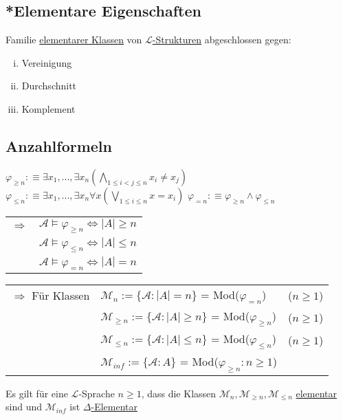 \documentclass[12pt,a4paper]{article} %
\begin{document}
	\subsection{*Elementare Eigenschaften}
	Familie \hyperref[Elementar]{elementarer Klassen} von \hyperref[Struktur]{$\mathcal{L}$-Strukturen} abgeschlossen gegen:
	\begin{enumerate}[(i)]
		\item Vereinigung
		\item Durchschnitt
		\item Komplement
	\end{enumerate}

	\subsection{Anzahlformeln}
	$\varphi_{\ge n} :\equiv \exists x_1, ..., \exists x_n (\bigwedge\limits_{1 \le i < j \le n} x_i \ne x_j)$ \newline
	$\varphi_{\le n} :\equiv \exists x_1, ..., \exists x_n \forall x (\bigvee\limits_{1 \le i \le n} x = x_i)$ \newline
	$\varphi_{= n} :\equiv \varphi_{\ge n} \land \varphi_{\le n}$
	
	\begin{tabular}{l l}
		$\Rightarrow$ & $\mathcal{A} \hyperref[Erfullbar]{\vDash} \varphi_{\ge n} \Leftrightarrow |A| \ge n$ \\
		& $\mathcal{A} \hyperref[Erfullbar]{\vDash} \varphi_{\le n} \Leftrightarrow |A| \le n$ \\
		& $\mathcal{A} \hyperref[Erfullbar]{\vDash} \varphi_{= n} \Leftrightarrow |A| = n$
	\end{tabular}

	\begin{tabular}{l l l}
		$\Rightarrow$ Für Klassen & $\mathcal{M}_n := \{\mathcal{A} : |A| = n\}$ = Mod($\varphi_{= n}$) & ($n \ge 1$) \\
		& $\mathcal{M}_{\ge n} := \{\mathcal{A} : |A| \ge n \}$ = Mod($\varphi_{\ge n}$) & ($n \ge 1$) \\
		& $\mathcal{M}_{\le n} := \{\mathcal{A} : |A| \le n\}$ = Mod($\varphi_{\le n}$) & ($n \ge 1$) \\
		& $\mathcal{M}_{inf} := \{\mathcal{A} : A\}$ = Mod($\varphi_{\ge n} : n \ge 1$) & \\
	\end{tabular}

	Es gilt für eine $\mathcal{L}$-Sprache $n \ge 1$, dass die Klassen $\mathcal{M}_n, \mathcal{M}_{\ge n}, \mathcal{M}_{\le n}$ \hyperref[Elementar]{elementar} sind und $\mathcal{M}_{inf}$ ist \hyperref[Elementar]{$\Delta$-Elementar}
	
\end{document}
